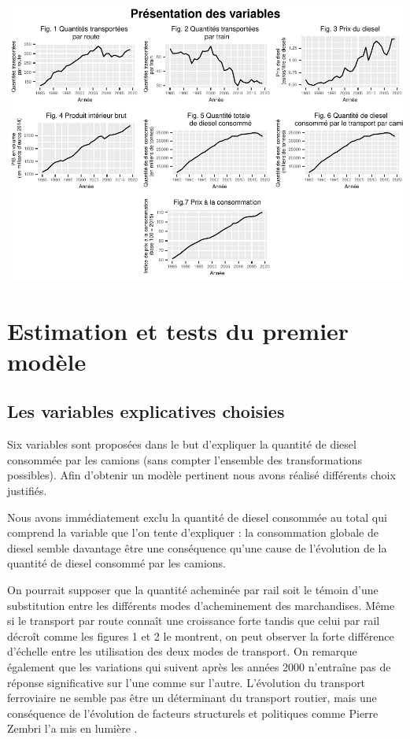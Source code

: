 \documentclass[
]{article}
\begin{document}
\begin{center}\includegraphics[width=1\linewidth,height=1\textheight]{Projet_econometrie_II_files/figure-latex/unnamed-chunk-5-1} \end{center}

\hypertarget{estimation-et-tests-du-premier-moduxe8le}{%
\section{Estimation et tests du premier
modèle}\label{estimation-et-tests-du-premier-moduxe8le}}

\hypertarget{les-variables-explicatives-choisies}{%
\subsection{Les variables explicatives
choisies}\label{les-variables-explicatives-choisies}}

Six variables sont proposées dans le but d'expliquer la quantité de
diesel consommée par les camions (sans compter l'ensemble des
transformations possibles). Afin d'obtenir un modèle pertinent nous
avons réalisé différents choix justifiés.

Nous avons immédiatement exclu la quantité de diesel consommée au total
qui comprend la variable que l'on tente d'expliquer : la consommation
globale de diesel semble davantage être une conséquence qu'une cause de
l'évolution de la quantité de diesel consommé par les camions.

On pourrait supposer que la quantité acheminée par rail soit le témoin
d'une substitution entre les différents modes d'acheminement des
marchandises. Même si le transport par route connaît une croissance
forte tandis que celui par rail décroît comme les figures 1 et 2 le
montrent, on peut observer la forte différence d'échelle entre les
utilisation des deux modes de transport. On remarque également que les
variations qui suivent après les années 2000 n'entraîne pas de réponse
significative sur l'une comme sur l'autre. L'évolution du transport
ferroviaire ne semble pas être un déterminant du transport routier, mais
une conséquence de l'évolution de facteurs structurels et politiques
comme Pierre Zembri l'a mis en lumière \autocite{zembri2004}.
\end{document}
